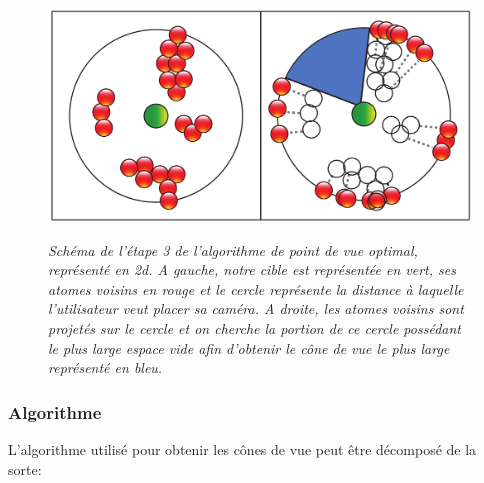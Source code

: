 \begin{figure}[h]
  \centering
  {\includegraphics[width=.5\linewidth]{./figures/ch3/voronoi_2D_algo_v2}}
    \caption[Schéma de l'étape 3 de l'algorithme de point de vue optimal, représenté en 2d.]{{\it Schéma de l'étape 3 de l'algorithme de point de vue optimal, représenté en 2d. A gauche, notre cible est représentée en vert, ses atomes voisins en rouge et le cercle représente la distance à laquelle l'utilisateur veut placer sa caméra. A droite, les atomes voisins sont projetés sur le cercle et on cherche la portion de ce cercle possédant le plus large espace vide afin d'obtenir le cône de vue le plus large représenté en bleu.}}
  \label{Fig:voronoi_2D_algo}
  \hspace{0.2cm}
\end{figure}

\subsubsection{Algorithme}

L'algorithme utilisé pour obtenir les cônes de vue peut être décomposé de la sorte:

